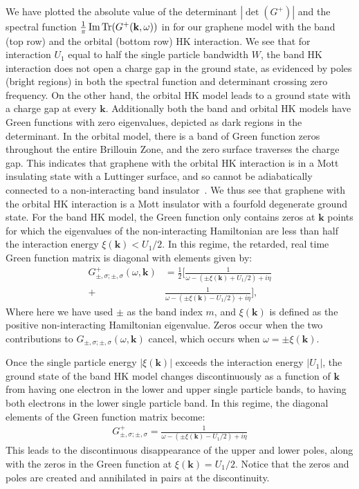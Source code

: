 \documentclass[prb,aps,amssymb,twocolumn,notitlepage]{revtex4-2}
\begin{document}
We have plotted the absolute value of the determinant $|\det(G^{+})|$ and the spectral function $\frac{1}{\pi}\Im\Tr(G^{+}(\mathbf{k},\omega))$ in  for our graphene model with the band (top row) and the orbital (bottom row) HK interaction. 
We see that for interaction $U_1$ equal to half the single particle bandwidth $W$, the band HK interaction does not open a charge gap in the ground state, as evidenced by poles (bright regions) in both the spectral function and determinant crossing zero frequency. 
On the other hand, the orbital HK model leads to a ground state with a charge gap at every $\mathbf{k}$. 
Additionally both the band and orbital HK models have Green functions with zero eigenvalues, depicted as dark regions in the determinant. 
In the orbital model, there is a band of Green function zeros throughout the entire Brillouin Zone, and the zero surface traverses the charge gap. 
This indicates that graphene with the orbital HK interaction is in a Mott insulating state with a Luttinger surface, and so cannot be adiabatically connected to a non-interacting band insulator~\cite{dave2013absence}. 
We thus see that graphene with the orbital HK interaction is a Mott insulator with a fourfold degenerate ground state. 
For the band HK model, the Green function only contains zeros at $\mathbf{k}$ points for which the eigenvalues of the non-interacting Hamiltonian are less than half the interaction energy $\xi(\mathbf{k})<U_1/2$. 
In this regime, the retarded, real time Green function matrix is diagonal with elements given by:
\begin{align}
    G^{+}_{\pm,\sigma;\pm,\sigma}(\omega,\mathbf{k})&=\frac{1}{2}\bigg[\frac{1}{\omega-(\pm\xi(\mathbf{k})+U_1/2)+i\eta}\\ \nonumber+&\frac{1}{\omega-(\pm\xi(\mathbf{k})-U_1/2)+i\eta}\bigg],
\end{align}
Where here we have used $\pm$ as the band index $m$, and $\xi(\mathbf{k})$ is defined as the positive non-interacting Hamiltonian eigenvalue. Zeros occur when the two contributions to $G_{\pm,\sigma;\pm,\sigma}(\omega,\mathbf{k})$ cancel, which occurs when $\omega=\pm\xi(\mathbf{k})$.

Once the single particle energy $|\xi(\mathbf{k})|$ exceeds the interaction energy $|U_{1}|$, the ground state of the band HK model changes discontinuously as a function of $\mathbf{k}$ from having one electron in the lower and upper single particle bands, to having both electrons in the lower single particle band. In this regime, the diagonal elements of the Green function matrix become:
\begin{align}
    G^{+}_{\pm,\sigma;\pm,\sigma}=\frac{1}{\omega -(\pm\xi(\mathbf{k})-U_1/2)+i\eta}
\end{align}
This leads to the discontinuous disappearance of the upper and lower poles, along with the zeros in the Green function at $\xi(\mathbf{k})=U_1/2$. 
Notice that the zeros and poles are created and annihilated in pairs at the discontinuity. 
\end{document}
